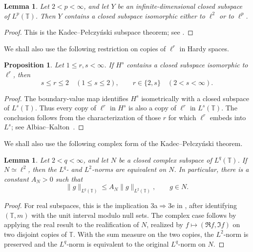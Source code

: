 \documentclass[11pt, reqno]{amsart}
\newtheorem{lemma}[theorem]{Lemma}
\newtheorem{proposition}[theorem]{Proposition}
\theoremstyle{definition}
\theoremstyle{remark}
\newcommand{\T}{\mathbb{T}}
\begin{document}
\begin{lemma}
\label{lem:kp-subspace}
Let \(2<p<\infty\), and let \(Y\) be an infinite-dimensional closed
subspace of \(L^p(\T)\). Then \(Y\) contains a closed subspace
isomorphic either to \(\ell^2\) or to \(\ell^p\).
\end{lemma}

\begin{proof}
This is the Kadec--Pe{\l}czy\'nski subspace theorem; see
\cite[Corollary~2, p.~168]{KadecPelczynski1962}.
\end{proof}

We shall also use the following restriction on copies of \(\ell^r\)
in Hardy spaces.

\begin{proposition}
\label{prop:ambient-ellr}
Let \(1\le r,s<\infty\). If \(H^s\) contains a closed subspace
isomorphic to \(\ell^r\), then
\[
        s\le r\le2 \quad (1\le s\le2),
        \qquad
        r\in\{2,s\} \quad (2<s<\infty).
\]
\end{proposition}

\begin{proof}
The boundary-value map identifies \(H^s\) isometrically with a closed
subspace of \(L^s(\T)\). Thus every copy of \(\ell^r\) in \(H^s\)
is also a copy of \(\ell^r\) in \(L^s(\T)\). The conclusion follows
from the characterization of those \(r\) for which \(\ell^r\)
embeds into \(L^s\); see
Albiac--Kalton~\cite[Theorem~6.4.19]{AlbiacKalton2016}.
\end{proof}

We shall also use the following complex form of the
Kadec--Pe{\l}czy\'nski theorem.

\begin{lemma}
\label{lem:kp-hilbert}
Let \(2<q<\infty\), and let \(N\) be a closed complex subspace of
\(L^q(\T)\). If \(N\simeq\ell^2\), then the \(L^q\)- and
\(L^2\)-norms are equivalent on \(N\). In particular, there is a
constant \(A_N>0\) such that
\[
        \|g\|_{L^q(\T)}
        \le
        A_N\|g\|_{L^2(\T)},
        \qquad
        g\in N.
\]
\end{lemma}

\begin{proof}
For real subspaces, this is the implication
\textup{3a}\(\Rightarrow\)\textup{3e} in
\cite[Theorem~3, pp.~166--167]{KadecPelczynski1962},
after identifying \((\T,m)\) with the unit interval modulo null sets.
The complex case follows by applying the real result to the
realification of \(N\), realized by
\(f\mapsto(\Re f,\Im f)\) on two disjoint copies of \(\T\).
With the sum measure on the two copies, the \(L^2\)-norm is preserved
and the \(L^q\)-norm is equivalent to the original \(L^q\)-norm on
\(N\).
\end{proof}
\end{document}
